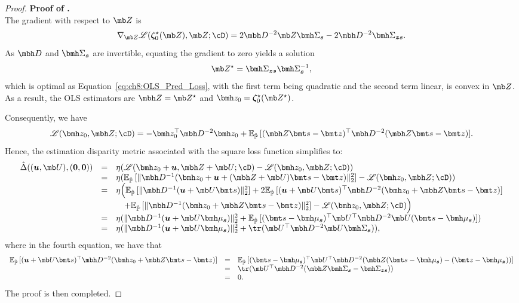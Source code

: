 \documentclass[opre, blindrev]{informs4}
\newcommand{\1}[1]{\mathds{1}{\left(#1\right)}}
\begin{document}
\begin{appendices}
\begin{proof}{\bf Proof of .}
\begin{equation}
\label{eq:ch8:OLS_Pred_Loss}
\end{equation}
The gradient with respect to $\mb Z$ is 
\[
\nabla_{\mb Z} \mathscr{L}(\bm \zeta_0^\star (\mb Z),\mb Z; \cD) = 2 \mbh D^{-2} \mb Z \bmh \Sigma_{\bm s} - 2 \mbh D^{-2} \bmh \Sigma_{\bm z \bm s}.
\]
As $\mbh D$ and $\bmh \Sigma_{\bm s}$ are invertible, equating the gradient to zero yields a solution 
$$
\mb Z^\star = \bmh \Sigma_{\bm z \bm s} \bmh \Sigma_{\bm s}^{-1},
$$
which is optimal as Equation~\eqref{eq:ch8:OLS_Pred_Loss}, with the first term being quadratic and the second term linear, is convex in $\mb Z$. As a result, the OLS estimators are $\mbh Z = \mb Z^\star$ and $\bmh z_0 = \bm \zeta_0^\star (\mb Z^\star)$.

Consequently, we have
$$
\mathscr{L}(\bmh z_0,\mbh Z; \cD) = - \bmh z_0^\top \mbh D^{-2} \bmh z_0 + \mathbb{E}_{\hat{\mathbb{P}}}\,[(\mbh Z \bmt s - \bmt z)^{\top} \mbh D^{-2} (\mbh Z \bmt s - \bmt z)].
$$
Hence, the estimation disparity metric associated with the square loss function simplifies to:
$$
\begin{array}{rcl}
\hat \Delta ((\bm u, \mb U),(\bm 0,\bm 0))
&=& \eta (\mathscr{L}(\bmh z_0 + \bm u,\mbh Z + \mb U; \cD) - \mathscr{L}(\bmh z_0,\mbh Z; \cD)) \\
&=& \eta (\mathbb{E}_{\hat{\mathbb{P}}}\,[\|\mbh D^{-1} (\bmh z_0  + \bm u + (\mbh Z + \mb U) \bmt s - \bmt z) \|_2^2] - \mathscr{L}(\bmh z_0,\mbh Z; \cD)) \\
&=& \eta \Big(\mathbb{E}_{\hat{\mathbb{P}}}\,[\| \mbh D^{-1} (\bm u + \mb U \bmt s) \|_2^2] + 2 \mathbb{E}_{\hat{\mathbb{P}}}\,[(\bm u + \mb U \bmt s)^\top \mbh D^{-2} (\bmh z_0 + \mbh Z \bmt s - \bmt z)] \\
& & \quad + \mathbb{E}_{\hat{\mathbb{P}}}\,[\| \mbh D^{-1} (\bmh z_0 + \mbh Z \bmt s - \bmt z) \|_2^2] - \mathscr{L}(\bmh z_0,\mbh Z; \cD) \Big) \\
&=& \eta (\|\mbh D^{-1} (\bm u + \mb U \bmh \mu_{\bm s})\|_2^2 + \mathbb{E}_{\hat{\mathbb{P}}}\,[(\bmt s - \bmh \mu_{\bm s})^\top \mb U^\top \mbh D^{-2} \mb U (\bmt s - \bmh \mu_{\bm s})]) \\
&=& \eta (\| \mbh D^{-1} (\bm u + \mb U \bmh \mu_{\bm s})\|_2^2 + \tr(\mb U^\top \mbh D^{-2} \mb U \bmh \Sigma_{\bm s})),
\end{array}
$$
where in the fourth equation, we have that
\[
\begin{array}{rcl}
\mathbb{E}_{\hat{\mathbb{P}}}\,[(\bm u + \mb U \bmt s)^\top \mbh D^{-2} (\bmh z_0 + \mbh Z \bmt s - \bmt z)] 
& = &\mathbb{E}_{\hat{\mathbb{P}}}\,[(\bmt s - \bmh \mu_{\bm s})^\top \mb U^\top \mbh D^{-2} (\mbh Z (\bmt s - \bmh \mu_{\bm s}) - (\bmt z - \bmh \mu_{\bm z}))] \\
& = & \tr(\mb U^\top \mbh D^{-2}(\mbh Z \bmh \Sigma_{\bm s} - \bmh \Sigma_{\bm z \bm s})) \\
& = & 0.
\end{array}
\]
The proof is then completed.
\hfill \Halmos
\end{proof}
\vspace{3mm}


\end{appendices}
\end{document}
